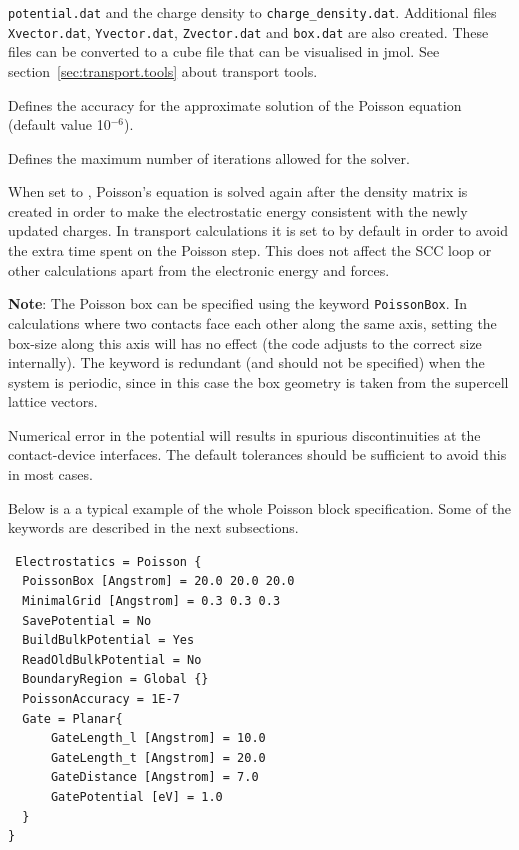 \begin{description}
  \verb|potential.dat| and the charge density to \verb|charge_density.dat|.
  Additional files \verb|Xvector.dat|, \verb|Yvector.dat|, \verb|Zvector.dat|
  and \verb|box.dat| are also created. These files can be converted to a cube
  file that can be visualised in jmol. See section~\ref{sec:transport.tools}
  about transport tools.
\item[\is{PoissonAccuracy}] Defines the accuracy for the approximate solution of
  the Poisson equation (default value 10$^{-6}$).
\item[\is{MaxPoissonIterations}] Defines the maximum number of iterations allowed
  for the solver.
\item[\is{RecomputeAfterDensity}] When set to , Poisson's equation is
  solved again after the density matrix is created in order to make the
  electrostatic energy consistent with the newly updated charges.  In transport
  calculations it is set to  by default in order to avoid the extra time
  spent on the Poisson step. This does not affect the SCC loop or other
  calculations apart from the electronic energy and forces.
\end{description}

{\bf Note}: The Poisson box can be specified using the keyword
\verb|PoissonBox|. In calculations where two contacts face each other along the
same axis, setting the box-size along this axis will has no effect (the code
adjusts to the correct size internally). The  keyword is
redundant (and should not be specified) when the system is periodic, since in
this case the box geometry is taken from the supercell lattice vectors.

Numerical error in the potential will results in spurious discontinuities at the
contact-device interfaces. The default tolerances should be sufficient to avoid
this in most cases.

Below is a a typical example of the whole Poisson block specification. Some of
the keywords are described in the next subsections.
\begin{verbatim}
 Electrostatics = Poisson {
  PoissonBox [Angstrom] = 20.0 20.0 20.0
  MinimalGrid [Angstrom] = 0.3 0.3 0.3
  SavePotential = No
  BuildBulkPotential = Yes
  ReadOldBulkPotential = No
  BoundaryRegion = Global {}
  PoissonAccuracy = 1E-7
  Gate = Planar{
      GateLength_l [Angstrom] = 10.0
      GateLength_t [Angstrom] = 20.0
      GateDistance [Angstrom] = 7.0
      GatePotential [eV] = 1.0
  }
}
\end{verbatim}

